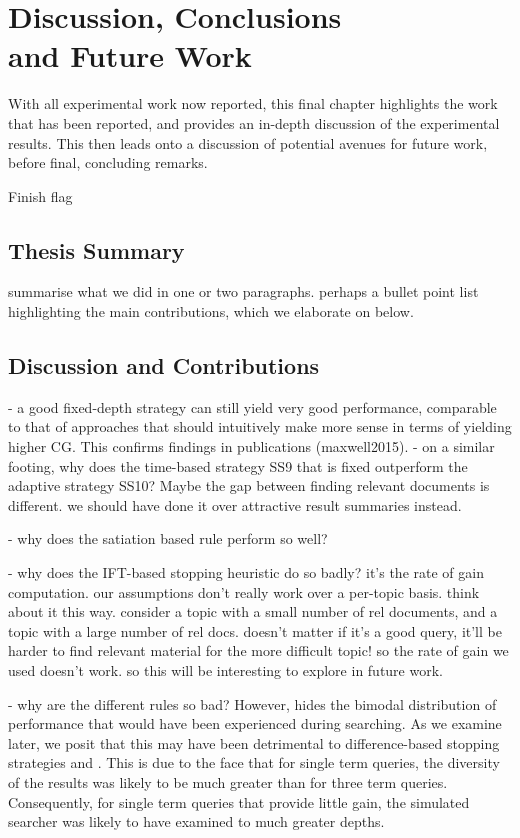 
\chapter[Discussion, Conclusions and Future Work]{Discussion, Conclusions\\and Future Work}\label{chap:conclusions}
With all experimental work now reported, this final chapter highlights the work that has been reported, and provides an in-depth discussion of the experimental results. This then leads onto a discussion of potential avenues for future work, before final, concluding remarks.

Finish flag

\section{Thesis Summary}

summarise what we did in one or two paragraphs. perhaps a bullet point list highlighting the main contributions, which we elaborate on below.


\section{Discussion and Contributions}

- a good fixed-depth strategy can still yield very good performance, comparable to that of approaches that should intuitively make more sense in terms of yielding higher CG. This confirms findings in publications (maxwell2015).
- on a similar footing, why does the time-based strategy SS9 that is fixed outperform the adaptive strategy SS10? Maybe the gap between finding relevant documents is different. we should have done it over attractive result summaries instead.

- why does the satiation based rule perform so well?

- why does the IFT-based stopping heuristic do so badly? it's the rate of gain computation. our assumptions don't really work over a per-topic basis. think about it this way. consider a topic with a small number of rel documents, and a topic with a large number of rel docs. doesn't matter if it's a good query, it'll be harder to find relevant material for the more difficult topic! so the rate of gain we used doesn't work. so this will be interesting to explore in future work.

- why are the different rules so bad? However,  hides the bimodal distribution of performance that would have been experienced during searching. As we examine later, we posit that this may have been detrimental to difference-based stopping strategies  and . This is due to the face that for single term queries, the diversity of the results was likely to be much greater than for three term queries. Consequently, for single term queries that provide little gain, the simulated searcher was likely to have examined to much greater depths. 

